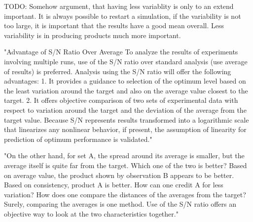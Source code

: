TODO: Somehow argument, that having less variablity is only to an extend important. It is always possible to restart a simulation, if the variability is not too large, it is important that the results have a good mean overall. Less variability is in producing products much more important.


"Advantage of S/N Ratio Over Average To analyze the results of experiments involving multiple runs, use of the S/N ratio over standard analysis (use average of results) is preferred. Analysis using the S/N ratio will offer the following advantages: 1. It provides a guidance to selection of the optimum level based on the least variation around the target and also on the average value closest to the target. 2. It offers objective comparison of two sets of experimental data with respect to variation around the target and the deviation of the average from the target value. Because S/N represents results transformed into a logarithmic scale that linearizes any nonlinear behavior, if present, the assumption of linearity for prediction of optimum performance is validated."\cite{roy_primer_1990}


"On the other hand, for set A, the spread around its average is smaller, but the average itself is quite far from the target. Which one of the two is better? Based on average value, the product shown by observation B appears to be better. Based on consistency, product A is better. How can one credit A for less variation? How does one compare the distances of the averages from the target? Surely, comparing the averages is one method. Use of the S/N ratio offers an objective way to look at the two characteristics together."\cite{roy_primer_1990}